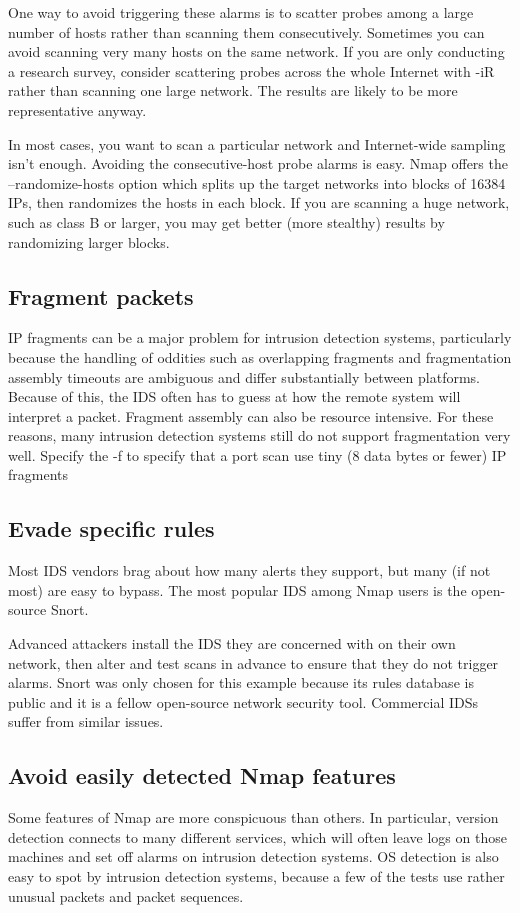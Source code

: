 One way to avoid triggering these alarms is to scatter probes among a large number of hosts rather than scanning them consecutively.
Sometimes you can avoid scanning very many hosts on the same network. If you are only conducting a research survey, consider scattering 
probes across the whole Internet with -iR rather than scanning one large network. 
The results are likely to be more representative anyway.

In most cases, you want to scan a particular network and Internet-wide sampling isn't enough. 
Avoiding the consecutive-host probe alarms is easy. Nmap offers the --randomize-hosts option which splits up the target networks into 
blocks of 16384 IPs, then randomizes the hosts in each block. 
If you are scanning a huge network, such as class B or larger, you may get better (more stealthy) results by randomizing larger blocks.

\subsection{Fragment packets}
IP fragments can be a major problem for intrusion detection systems, particularly because the handling of oddities such as overlapping 
fragments and fragmentation assembly timeouts are ambiguous and differ substantially between platforms. 
Because of this, the IDS often has to guess at how the remote system will interpret a packet. 
Fragment assembly can also be resource intensive. 
For these reasons, many intrusion detection systems still do not support fragmentation very well. 
Specify the -f to specify that a port scan use tiny (8 data bytes or fewer) IP fragments

\subsection{Evade specific rules}
Most IDS vendors brag about how many alerts they support, but many (if not most) are easy to bypass. 
The most popular IDS among Nmap users is the open-source Snort.

Advanced attackers install the IDS they are concerned with on their own network, then alter and test scans in advance 
to ensure that they do not trigger alarms.
Snort was only chosen for this example because its rules database is public and it is a fellow open-source network security tool. 
Commercial IDSs suffer from similar issues.

\subsection{Avoid easily detected Nmap features}
Some features of Nmap are more conspicuous than others. 
In particular, version detection connects to many different services, which will often leave logs on those machines 
and set off alarms on intrusion detection systems. 
OS detection is also easy to spot by intrusion detection systems, because a few of the tests use 
rather unusual packets and packet sequences.

